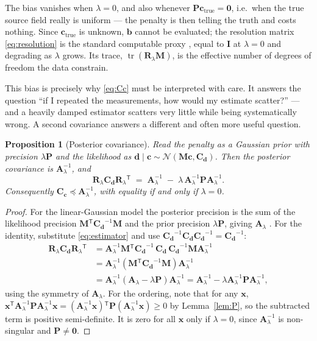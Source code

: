 \documentclass[11pt]{article}
\newcommand{\cvec}{\ensuremath{\mathbf{c}}\xspace}
\newcommand{\dvec}{\ensuremath{\mathbf{d}}\xspace}
\newcommand{\Mmat}{\ensuremath{\mathbf{M}}\xspace}
\newcommand{\Rmat}{\ensuremath{\mathbf{R}}\xspace}
\newcommand{\Pmat}{\ensuremath{\mathbf{P}}\xspace}
\newcommand{\Amat}{\ensuremath{\mathbf{A}}\xspace}
\newcommand{\Imat}{\ensuremath{\mathbf{I}}\xspace}
\newcommand{\Cd}{\ensuremath{\mathbf{C}_{\mathbf{d}}}\xspace}
\newcommand{\Cc}{\ensuremath{\mathbf{C}_{\mathbf{c}}}\xspace}
\newcommand{\transpose}{\ensuremath{^{\mathsf{T}}}}
\newtheorem{theorem}{Proposition}
\theoremstyle{definition}
\begin{document}
\noindent The bias vanishes when $\lambda = 0$, and also whenever $\Pmat\cvec_{\text{true}} =
\bm 0$, i.e.\ when the true source field really is uniform --- the penalty is then telling the
truth and costs nothing. Since $\cvec_{\text{true}}$ is unknown, $\mathbf{b}$ cannot be
evaluated; the resolution matrix \eqref{eq:resolution} is the standard computable proxy
\parencite{menke_geophysical_2012}, equal to $\Imat$ at $\lambda = 0$ and degrading as
$\lambda$ grows. Its trace, $\operatorname{tr}(\Rmat_\lambda\Mmat)$, is the effective number of
degrees of freedom the data constrain.

This bias is precisely why \eqref{eq:Cc} must be interpreted with care. It answers the
question ``if I repeated the measurements, how would my estimate scatter?'' --- and a heavily
damped estimator scatters very little while being systematically wrong. A second covariance
answers a different and often more useful question.

\begin{theorem}[Posterior covariance]\label{prop:posterior}
Read the penalty as a Gaussian prior with precision $\lambda\Pmat$ and the likelihood as
$\dvec \mid \cvec \sim \mathcal{N}(\Mmat\cvec, \Cd)$. Then the posterior covariance is
$\Amat_\lambda^{-1}$, and
\begin{equation}
  \boxed{\;
  \Rmat_\lambda\Cd\Rmat_\lambda\transpose
  \;=\; \Amat_\lambda^{-1} \;-\; \lambda\,\Amat_\lambda^{-1}\Pmat\Amat_\lambda^{-1} .
  \;}
  \label{eq:identity}
\end{equation}
Consequently $\Cc \preceq \Amat_\lambda^{-1}$, with equality if and only if $\lambda = 0$.
\end{theorem}

\begin{proof}
For the linear-Gaussian model the posterior precision is the sum of the likelihood precision
$\Mmat\transpose\Cd^{-1}\Mmat$ and the prior precision $\lambda\Pmat$, giving $\Amat_\lambda$
\parencite{tarantola_inverse_2005}. For the identity, substitute \eqref{eq:estimator} and use
$\Cd^{-1}\Cd\Cd^{-1} = \Cd^{-1}$:
\begin{align*}
  \Rmat_\lambda\Cd\Rmat_\lambda\transpose
  &= \Amat_\lambda^{-1}\Mmat\transpose\Cd^{-1}\,\Cd\,\Cd^{-1}\Mmat\Amat_\lambda^{-1} \\
  &= \Amat_\lambda^{-1}\left(\Mmat\transpose\Cd^{-1}\Mmat\right)\Amat_\lambda^{-1} \\
  &= \Amat_\lambda^{-1}\left(\Amat_\lambda - \lambda\Pmat\right)\Amat_\lambda^{-1}
   = \Amat_\lambda^{-1} - \lambda\Amat_\lambda^{-1}\Pmat\Amat_\lambda^{-1},
\end{align*}
using the symmetry of $\Amat_\lambda$. For the ordering, note that for any $\mathbf{x}$,
$\mathbf{x}\transpose\Amat_\lambda^{-1}\Pmat\Amat_\lambda^{-1}\mathbf{x} =
(\Amat_\lambda^{-1}\mathbf{x})\transpose\Pmat(\Amat_\lambda^{-1}\mathbf{x}) \ge 0$ by
Lemma~\ref{lem:P}, so the subtracted term is positive semi-definite. It is zero for all
$\mathbf{x}$ only if $\lambda = 0$, since $\Amat_\lambda^{-1}$ is non-singular and $\Pmat \ne
\bm 0$.
\end{proof}
\end{document}
